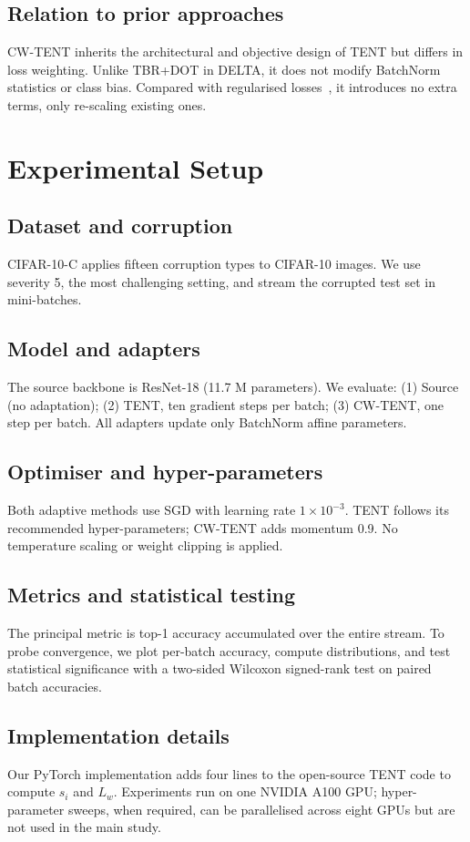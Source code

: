 \documentclass{article} %
\begin{document}
\subsection{Relation to prior approaches}
CW-TENT inherits the architectural and objective design of TENT but differs in loss weighting. Unlike TBR+DOT in DELTA, it does not modify BatchNorm statistics or class bias. Compared with regularised losses~\cite{author-year-test}, it introduces no extra terms, only re-scaling existing ones.

\section{Experimental Setup}%
\label{sec:experimental}%
\subsection{Dataset and corruption}
CIFAR-10-C applies fifteen corruption types to CIFAR-10 images. We use severity 5, the most challenging setting, and stream the corrupted test set in mini-batches.

\subsection{Model and adapters}
The source backbone is ResNet-18 (11.7 M parameters). We evaluate: (1) Source (no adaptation); (2) TENT, ten gradient steps per batch; (3) CW-TENT, one step per batch. All adapters update only BatchNorm affine parameters.

\subsection{Optimiser and hyper-parameters}
Both adaptive methods use SGD with learning rate \(1\times 10^{-3}\). TENT follows its recommended hyper-parameters; CW-TENT adds momentum 0.9. No temperature scaling or weight clipping is applied.

\subsection{Metrics and statistical testing}
The principal metric is top-1 accuracy accumulated over the entire stream. To probe convergence, we plot per-batch accuracy, compute distributions, and test statistical significance with a two-sided Wilcoxon signed-rank test on paired batch accuracies.

\subsection{Implementation details}
Our PyTorch implementation adds four lines to the open-source TENT code to compute \(s_{i}\) and \(L_{w}\). Experiments run on one NVIDIA A100 GPU\@; hyper-parameter sweeps, when required, can be parallelised across eight GPUs but are not used in the main study.
\end{document}
